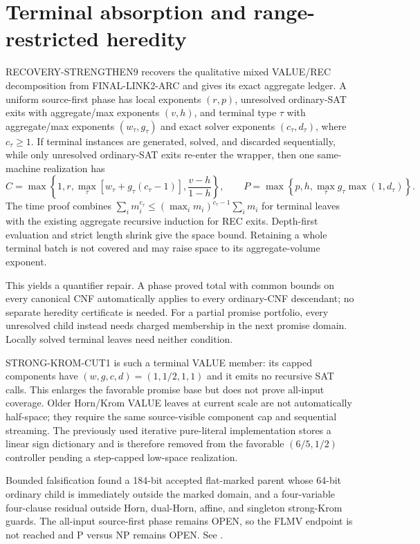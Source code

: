 \section{Terminal absorption and range-restricted heredity}

RECOVERY-STRENGTHEN9 recovers the qualitative mixed VALUE/REC decomposition
from FINAL-LINK2-ARC and gives its exact aggregate ledger.  A uniform
source-first phase has local exponents $(r,p)$, unresolved ordinary-SAT exits
with aggregate/max exponents $(v,h)$, and terminal type $\tau$ with
aggregate/max exponents $(w_\tau,g_\tau)$ and exact solver exponents
$(c_\tau,d_\tau)$, where $c_\tau\ge1$.  If terminal instances are generated,
solved, and discarded sequentially, while only unresolved ordinary-SAT exits
re-enter the wrapper, then one same-machine realization has
\[
 C=\max\!\left\{1,r,
   \max_\tau[w_\tau+g_\tau(c_\tau-1)],
   \frac{v-h}{1-h}\right\},
 \qquad
 P=\max\!\left\{p,h,
   \max_\tau g_\tau\max(1,d_\tau)\right\}.
\]
The time proof combines
$\sum_i m_i^{c_\tau}\le(\max_i m_i)^{c_\tau-1}\sum_i m_i$
for terminal leaves with the existing aggregate recursive induction for REC
exits.  Depth-first evaluation and strict length shrink give the space bound.
Retaining a whole terminal batch is not covered and may raise space to its
aggregate-volume exponent.

This yields a quantifier repair.  A phase proved total with common bounds on
every canonical CNF automatically applies to every ordinary-CNF descendant;
no separate heredity certificate is needed.  For a partial promise
portfolio, every unresolved child instead needs charged membership in the
next promise domain.  Locally solved terminal leaves need neither condition.

STRONG-KROM-CUT1 is such a terminal VALUE member: its capped components have
$(w,g,c,d)=(1,1/2,1,1)$ and it emits no recursive SAT calls.  This enlarges
the favorable promise base but does not prove all-input coverage.  Older
Horn/Krom VALUE leaves at current scale are not automatically half-space;
they require the same source-visible component cap and sequential streaming.
The previously used iterative pure-literal implementation stores a linear
sign dictionary and is therefore removed from the favorable
$(6/5,1/2)$ controller pending a step-capped low-space realization.

Bounded falsification found a 184-bit accepted flat-marked parent whose
64-bit ordinary child is immediately outside the marked domain, and a
four-variable four-clause residual outside Horn, dual-Horn, affine, and
singleton strong-Krom guards.  The all-input source-first phase remains
OPEN, so the FLMV endpoint is not reached and P versus NP remains OPEN.  See
.
